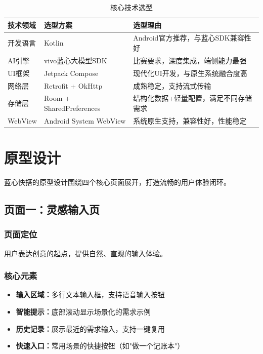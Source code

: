 \documentclass[a4paper,12pt]{ctexart}
\begin{document}
\begin{table}[H]
    \centering
    \caption{核心技术选型}
    \begin{tabularx}{\textwidth}{|l|l|X|}
        \hline
        \textbf{技术领域} & \textbf{选型方案} & \textbf{选型理由} \\
        \hline
        开发语言 & Kotlin & Android官方推荐，与蓝心SDK兼容性好 \\
        \hline
        AI引擎 & vivo蓝心大模型SDK & 比赛要求，深度集成，端侧能力最强 \\
        \hline
        UI框架 & Jetpack Compose & 现代化UI开发，与原生系统融合度高 \\
        \hline
        网络层 & Retrofit + OkHttp & 成熟稳定，支持流式传输 \\
        \hline
        存储层 & Room + SharedPreferences & 结构化数据+轻量配置，满足不同存储需求 \\
        \hline
        WebView & Android System WebView & 系统原生支持，兼容性好，性能稳定 \\
        \hline
    \end{tabularx}
\end{table}

\section{原型设计}

蓝心快搭的原型设计围绕四个核心页面展开，打造流畅的用户体验闭环。

\subsection{页面一：灵感输入页}

\subsubsection{页面定位}
用户表达创意的起点，提供自然、直观的输入体验。

\subsubsection{核心元素}
\begin{itemize}[leftmargin=2em]
    \item \textbf{输入区域：}多行文本输入框，支持语音输入按钮
    \item \textbf{智能提示：}底部滚动显示场景化的需求示例
    \item \textbf{历史记录：}展示最近的需求输入，支持一键复用
    \item \textbf{快速入口：}常用场景的快捷按钮（如"做一个记账本"）
\end{itemize}
\end{document}
